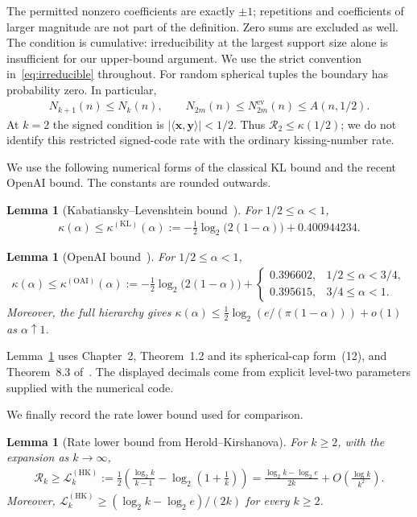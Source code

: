 \documentclass[pdflatex,sn-mathphys-num]{sn-jnl}
\theoremstyle{thmstyleone}
\newtheorem{lemma}[theorem]{Lemma}
\theoremstyle{thmstyletwo}
\newcommand{\Rrate}{\mathcal{R}}
\newcommand{\Lrate}{\mathcal{L}}
\newcommand{\vx}{\mathbf{x}}
\newcommand{\vy}{\mathbf{y}}
\newcommand{\ev}{\mathrm{ev}}
\newcommand{\KL}{\mathrm{KL}}
\newcommand{\HK}{\mathrm{HK}}
\newcommand{\OAI}{\mathrm{OAI}}
\begin{document}
The permitted nonzero coefficients are exactly $\pm1$; repetitions and coefficients of larger magnitude are not part of the definition. Zero sums are excluded as well. The condition is cumulative: irreducibility at the largest support size alone is insufficient for our upper-bound argument. We use the strict convention in~\eqref{eq:irreducible} throughout. For random spherical tuples the boundary has probability zero. In particular,
\begin{align}\label{eq:monotonicity}
 N_{k+1}(n)\le N_k(n),\qquad
 N_{2m}(n)\le N^{\ev}_{2m}(n)\le A(n,1/2).
\end{align}
At $k=2$ the signed condition is $|\langle\vx,\vy\rangle|<1/2$. Thus $\Rrate_2\le\kappa(1/2)$; we do not identify this restricted signed-code rate with the ordinary kissing-number rate.

We use the following numerical forms of the classical KL bound and the recent OpenAI bound. The constants are rounded outwards.

\begin{lemma}[Kabatiansky--Levenshtein bound~\cite{KL78}]\label{lem:kl}
For $1/2\le\alpha<1$,
\begin{align}\label{eq:kl}
 \kappa(\alpha)\le\kappa^{(\KL)}(\alpha)
 :=-\frac12\log_2\bigl(2(1-\alpha)\bigr)+0.400944234.
\end{align}
\end{lemma}

\begin{lemma}[OpenAI bound~\cite{OAI26}]\label{lem:oai}
For $1/2\le\alpha<1$,
\begin{align}\label{eq:oai}
 \kappa(\alpha)\le\kappa^{(\OAI)}(\alpha)
 :=-\frac12\log_2\bigl(2(1-\alpha)\bigr)+
 \begin{cases}
  0.396602,&1/2\le\alpha<3/4,\\
  0.395615,&3/4\le\alpha<1.
 \end{cases}
\end{align}
Moreover, the full hierarchy gives $\kappa(\alpha)\le\tfrac12\log_2(e/(\pi(1-\alpha)))+o(1)$ as $\alpha\uparrow1$.
\end{lemma}

Lemma~\ref{lem:oai} uses Chapter~2, Theorem~1.2 and its spherical-cap form~(12), and Theorem~8.3 of~\cite{OAI26}. The displayed decimals come from explicit level-two parameters supplied with the numerical code.

We finally record the rate lower bound used for comparison.

\begin{lemma}[Rate lower bound from Herold--Kirshanova]\label{lem:hk-lower}
For $k\ge2$, with the expansion as $k\to\infty$,
\begin{align}\label{eq:lower-rate}
 \Rrate_k\ge\Lrate_k^{(\HK)}
 :=\frac12\left(\frac{\log_2k}{k-1}-\log_2\left(1+\tfrac{1}{k}\right)\right)
 =\frac{\log_2k-\log_2e}{2k}+O\!\left(\frac{\log k}{k^2}\right).
\end{align}
Moreover, $\Lrate_k^{(\HK)}\ge(\log_2k-\log_2e)/(2k)$ for every $k\ge2$.
\end{lemma}
\end{document}
